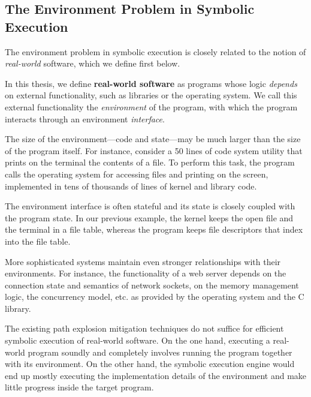 \subsection{The Environment Problem in Symbolic Execution}

The environment problem in symbolic execution is closely related to the notion of \emph{real-world} software, which we define first below.

\begin{framed}
  In this thesis, we define \textbf{real-world software} as programs whose logic \emph{depends} on external functionality, such as libraries or the operating system.
  We call this external functionality the \emph{environment} of the program, with which the program interacts through an environment \emph{interface}.
\end{framed}

The size of the environment---code and state---may be much larger than the size of the program itself.
%
For instance, consider a 50 lines of code system utility that prints on the terminal the contents of a file.  To perform this task, the program calls the operating system for accessing files and printing on the screen, implemented in tens of thousands of lines of kernel and library code.


%
The environment interface is often stateful and its state is closely coupled with the program state.
%
In our previous example, the kernel keeps the open file and the terminal in a file table, whereas the program keeps file descriptors that index into the file table.

More sophisticated systems maintain even stronger relationships with their environments.
%
For instance, the functionality of a web server depends on the connection state and semantics of network sockets, on the memory management logic, the concurrency model, etc. as provided by the operating system and the C library.

The existing path explosion mitigation techniques do not suffice for efficient symbolic execution of real-world software.
%
On the one hand, executing a real-world program soundly and completely involves running the program together with its environment.
%
On the other hand, the symbolic execution engine would end up mostly executing the implementation details of the environment and make little progress inside the target program.


